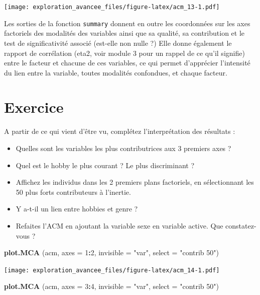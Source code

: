 \documentclass[]{book}
\newenvironment{Shaded}{\begin{snugshade}}{\end{snugshade}}
\newcommand{\DataTypeTok}[1]{\textcolor[rgb]{0.13,0.29,0.53}{#1}}
\newcommand{\DecValTok}[1]{\textcolor[rgb]{0.00,0.00,0.81}{#1}}
\newcommand{\KeywordTok}[1]{\textcolor[rgb]{0.13,0.29,0.53}{\textbf{#1}}}
\newcommand{\NormalTok}[1]{#1}
\newcommand{\OperatorTok}[1]{\textcolor[rgb]{0.81,0.36,0.00}{\textbf{#1}}}
\newcommand{\StringTok}[1]{\textcolor[rgb]{0.31,0.60,0.02}{#1}}
\providecommand{\tightlist}{%
  \setlength{\itemsep}{0pt}\setlength{\parskip}{0pt}}
\begin{document}
\texttt{[image: exploration\_avancee\_files/figure-latex/acm\_13-1.pdf]}

Les sorties de la fonction \texttt{summary} donnent en outre les coordonnées sur les axes factoriels des modalités des variables ainsi que sa qualité, sa contribution et le test de significativité associé (est-elle non nulle ?)
Elle donne également le rapport de corrélation (eta2, voir module 3 pour un rappel de ce qu'il signifie) entre le facteur et chacune de ces variables, ce qui permet d'apprécier l'intensité du lien entre la variable, toutes modalités confondues, et chaque facteur.

\hypertarget{exercice-2}{%
\section{Exercice}\label{exercice-2}}

A partir de ce qui vient d'être vu, complétez l'interprétation des résultats :

\begin{itemize}
\tightlist
\item
  Quelles sont les variables les plus contributrices aux 3 premiers axes ?
\item
  Quel est le hobby le plus courant ? Le plus discriminant ?
\item
  Affichez les individus dans les 2 premiers plans factoriels, en sélectionnant les 50 plus forts contributeurs à l'inertie.
\item
  Y a-t-il un lien entre hobbies et genre ?
\item
  Refaites l'ACM en ajoutant la variable sexe en variable active. Que constatez-vous ?
\end{itemize}

\begin{Shaded}
\begin{Highlighting}[]
\KeywordTok{plot.MCA}\NormalTok{ (acm, }\DataTypeTok{axes =} \DecValTok{1}\OperatorTok{:}\DecValTok{2}\NormalTok{, }\DataTypeTok{invisible =} \StringTok{"var"}\NormalTok{, }\DataTypeTok{select =} \StringTok{"contrib 50"}\NormalTok{)}
\end{Highlighting}
\end{Shaded}

\texttt{[image: exploration\_avancee\_files/figure-latex/acm\_14-1.pdf]}

\begin{Shaded}
\begin{Highlighting}[]
\KeywordTok{plot.MCA}\NormalTok{ (acm, }\DataTypeTok{axes =} \DecValTok{3}\OperatorTok{:}\DecValTok{4}\NormalTok{, }\DataTypeTok{invisible =} \StringTok{"var"}\NormalTok{, }\DataTypeTok{select =} \StringTok{"contrib 50"}\NormalTok{)}
\end{Highlighting}
\end{Shaded}
\end{document}
